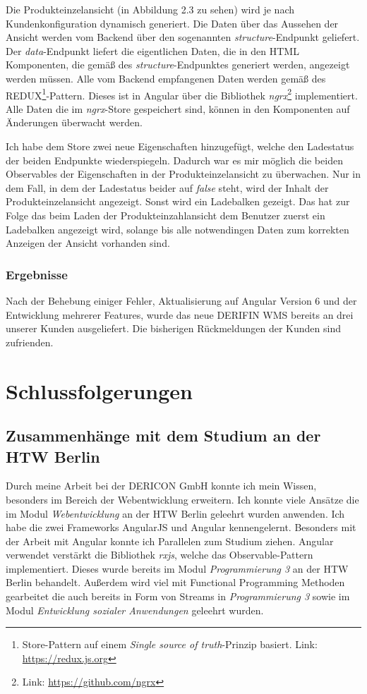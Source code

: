 \documentclass[chapterprefix=false, 12pt, a4paper, oneside, parskip=half, listof=totoc, bibliography=totoc, numbers=noendperiod]{scrbook}
\begin{document}
    Die Produkteinzelansicht (in Abbildung 2.3 zu sehen) wird je nach Kundenkonfiguration dynamisch generiert.
    Die Daten über das Aussehen der Ansicht werden vom Backend über den sogenannten \textit{structure}-Endpunkt geliefert.
    Der \textit{data}-Endpunkt liefert die eigentlichen Daten, die in den HTML Komponenten, die gemäß des \textit{structure}-Endpunktes
    generiert werden, angezeigt werden müssen. Alle vom Backend empfangenen Daten werden gemäß des
    REDUX\footnote{Store-Pattern auf einem \textit{Single source of truth}-Prinzip basiert. Link: \url{https://redux.js.org}}-Pattern.
    Dieses ist in Angular über die Bibliothek \textit{ngrx}\footnote{Link: \url{https://github.com/ngrx}} implementiert.
    Alle Daten die im \textit{ngrx}-Store gespeichert sind, können in den Komponenten auf Änderungen überwacht werden.

    Ich habe dem Store zwei neue Eigenschaften hinzugefügt, welche den Ladestatus der beiden Endpunkte wiederspiegeln.
    Dadurch war es mir möglich die beiden Observables der Eigenschaften in der Produkteinzelansicht zu überwachen.
    Nur in dem Fall, in dem der Ladestatus beider auf \textit{false} steht, wird der Inhalt der Produkteinzelansicht angezeigt.
    Sonst wird ein Ladebalken gezeigt. Das hat zur Folge das beim Laden der Produkteinzahlansicht dem Benutzer zuerst ein Ladebalken
    angezeigt wird, solange bis alle notwendingen Daten zum korrekten Anzeigen der Ansicht vorhanden sind.


    \subsection{Ergebnisse}

    Nach der Behebung einiger Fehler, Aktualisierung auf Angular Version 6 und der Entwicklung mehrerer Features,
    wurde das neue DERIFIN WMS bereits an drei unserer Kunden ausgeliefert. Die bisherigen Rückmeldungen der Kunden sind zufrienden.

    \chapter{Schlussfolgerungen}

    \section{Zusammenhänge mit dem Studium an der HTW Berlin}

    Durch meine Arbeit bei der DERICON GmbH konnte ich mein Wissen, besonders im Bereich der Webentwicklung erweitern.
    Ich konnte viele Ansätze die im Modul \textit{Webentwicklung} an der HTW  Berlin geleehrt wurden anwenden. Ich habe die zwei Frameworks
    AngularJS und Angular kennengelernt. Besonders mit der Arbeit mit Angular konnte ich Parallelen zum Studium ziehen. Angular
    verwendet verstärkt die Bibliothek \textit{rxjs}, welche das Observable-Pattern implementiert. Dieses wurde bereits im Modul
    \textit{Programmierung 3} an der HTW Berlin behandelt. Außerdem wird viel mit Functional Programming Methoden gearbeitet die auch bereits in Form
    von Streams in \textit{Programmierung 3} sowie im Modul \textit{Entwicklung sozialer Anwendungen} geleehrt wurden.
\end{document}
